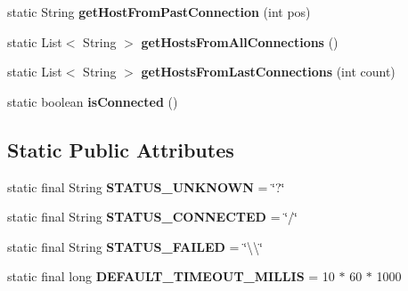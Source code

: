 \begin{DoxyCompactItemize}
static String {\bfseries get\+Host\+From\+Past\+Connection} (int pos)
\item 
\mbox{\label{classtestsuite_1_1_unreliable_socket_factory_ab70a79c8c060bbd42135dcccac232a3e}} 
static List$<$ String $>$ {\bfseries get\+Hosts\+From\+All\+Connections} ()
\item 
\mbox{\label{classtestsuite_1_1_unreliable_socket_factory_af95d260d8de35629bf4735fb9946006b}} 
static List$<$ String $>$ {\bfseries get\+Hosts\+From\+Last\+Connections} (int count)
\item 
\mbox{\label{classtestsuite_1_1_unreliable_socket_factory_a2a98c5f404403d475332e8b557560614}} 
static boolean {\bfseries is\+Connected} ()
\end{DoxyCompactItemize}
\subsection*{Static Public Attributes}
\begin{DoxyCompactItemize}
\item 
\mbox{\label{classtestsuite_1_1_unreliable_socket_factory_ab3f9a10e0c6fb5b7b50961c354cb168e}} 
static final String {\bfseries S\+T\+A\+T\+U\+S\+\_\+\+U\+N\+K\+N\+O\+WN} = \char`\"{}?\char`\"{}
\item 
\mbox{\label{classtestsuite_1_1_unreliable_socket_factory_aba26420cbe3743803295fa8acdefac55}} 
static final String {\bfseries S\+T\+A\+T\+U\+S\+\_\+\+C\+O\+N\+N\+E\+C\+T\+ED} = \char`\"{}/\char`\"{}
\item 
\mbox{\label{classtestsuite_1_1_unreliable_socket_factory_a012aaa326daab499cde10b634a549785}} 
static final String {\bfseries S\+T\+A\+T\+U\+S\+\_\+\+F\+A\+I\+L\+ED} = \char`\"{}\textbackslash{}\textbackslash{}\char`\"{}
\item 
\mbox{\label{classtestsuite_1_1_unreliable_socket_factory_a04b724f9bcd5e359856361166c4ecf32}} 
static final long {\bfseries D\+E\+F\+A\+U\+L\+T\+\_\+\+T\+I\+M\+E\+O\+U\+T\+\_\+\+M\+I\+L\+L\+IS} = 10 $\ast$ 60 $\ast$ 1000
\end{DoxyCompactItemize}
